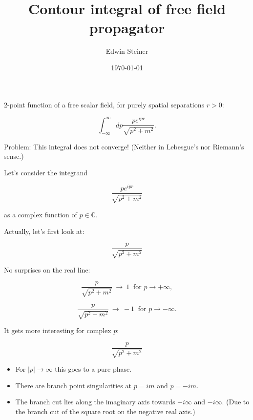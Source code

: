 \documentclass{beamer}
\title{Contour integral of free field propagator}
\author{Edwin Steiner}
\date{\today}
\newcommand{\envelope}{\frac{p}{\sqrt{p^2 + m^2}}}
\newcommand{\integrand}{\frac{p e^{ipr}}{\sqrt{p^2 + m^2}}}
\newcommand{\CC}{\mathbb{C}}
\begin{document}
\begin{frame}
\titlepage
\end{frame}


\begin{frame}
2-point function of a free scalar field, for purely spatial separations $r > 0$:

$$\int_{-\infty}^{\infty} dp \integrand.$$

\pause
Problem: \alert{This integral does not converge!} (Neither in Lebesgue's
nor Riemann's sense.)
\end{frame}


\begin{frame}
Let's consider the integrand

$$\integrand$$

as a complex function of $p \in \CC$.

\end{frame}


\begin{frame}
Actually, let's first look at:

$$\envelope$$

\pause
No surprises on the real line:

\pause
$$\envelope \ \rightarrow \ 1 \ \textrm{ for } p \rightarrow +\infty,$$

$$\envelope \ \rightarrow \ -1 \ \textrm{ for } p \rightarrow -\infty.$$

\end{frame}




\begin{frame}
It gets more interesting for complex $p$:

$$\envelope$$

\begin{itemize}

\pause
\item For $|p| \rightarrow \infty$ this goes to  a pure phase.

\pause
\item There are branch point \alert{singularities} at $p = im$ and $p = -im$.

\pause
\item The \alert{branch cut} lies along the imaginary axis towards $+i\infty$ and $-i\infty$.
(Due to the branch cut of the square root on the negative real axis.)
\end{itemize}
\end{frame}
\end{document}
